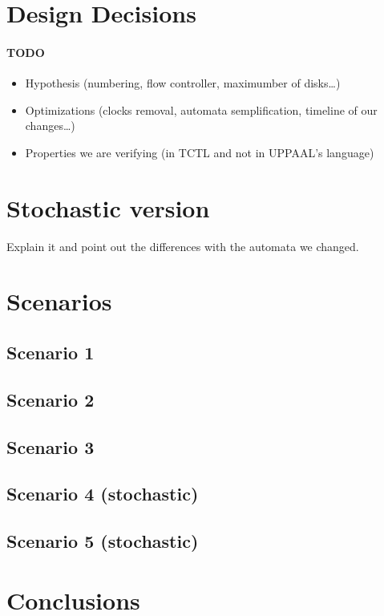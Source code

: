 \documentclass[a4paper]{article}
\begin{document}
    \section{Design Decisions} \label{section:design_decisions}

    \paragraph{TODO}
    \begin{itemize}
        \item Hypothesis (numbering, flow controller, maximumber of disks\dots)
        \item Optimizations (clocks removal, automata semplification, timeline of our changes\dots)
        \item Properties we are verifying (in TCTL and not in UPPAAL's language)
    \end{itemize}

    \section{Stochastic version}

    Explain it and point out the differences with the automata we changed.

    \section{Scenarios}

    \subsection{Scenario 1}

    \subsection{Scenario 2}

    \subsection{Scenario 3}

    \subsection{Scenario 4 (stochastic)}

    \subsection{Scenario 5 (stochastic)}

    \section{Conclusions}
\end{document}
